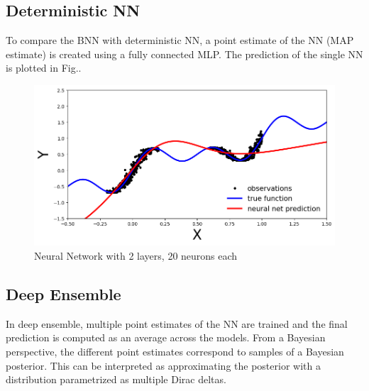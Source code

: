 \documentclass[11pt,a4paper]{article}
\begin{document}
\subsection{Deterministic NN}
To compare the BNN with deterministic NN, a point estimate of the NN (MAP estimate) is created using a fully connected MLP. The prediction of the single NN is plotted in Fig.\fbox{\ref{fig:one nn}}.


\begin{figure}[h!]
    \centering
    \includegraphics[scale=0.5]{deterministic nn.png}
    \caption{Neural Network with 2 layers, 20 neurons each}
    \label{fig:one nn}
\end{figure}


\subsection{Deep Ensemble}
In deep ensemble, multiple point estimates of the NN are trained and the final prediction is computed as an average across the models. From a Bayesian perspective, the different point estimates correspond to samples of a Bayesian posterior. This can be interpreted as approximating the posterior with a distribution parametrized as multiple Dirac deltas.
\end{document}
